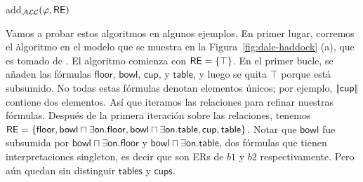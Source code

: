 \begin{algorithm}[H]
\caption{add$_\mathcal{ALC}(\varphi,\textsf{RE})$}
\label{algo:bisim-add-alc}
\end{algorithm}

Vamos a probar estos algoritmos en algunos ejemplos. En primer lugar, corremos el \el \.
algoritmo en el modelo que se muestra en la Figura~\ref{fig:dale-haddock} (a), que es
tomado de \cite{dale91:gener}. El
algoritmo comienza con $ \textsf{RE} = \{\top \} $. En el primer bucle, se a\~naden
las f\'ormulas $\mathsf{floor}$, $\mathsf{bowl}$, $\mathsf{cup}$, y
$\mathsf{table}$, y luego se quita $\top$ porque est\'a subsumido.
No todas estas f\'ormulas denotan elementos \'unicos; por ejemplo,
$|\!|\mathsf{cup}|\!|$ contiene dos elementos. As\'i que iteramos
las relaciones para refinar nuestras f\'ormulas. Despu\'es de la primera iteraci\'on sobre
las relaciones, tenemos  $\textsf{RE} = \{ \mathsf{floor}, \mathsf{bowl} \sqcap
\exists \mathsf{on}.\mathsf{floor}, \mathsf{bowl} \sqcap \exists
\mathsf{on}.\mathsf{table}, \mathsf{cup}, \mathsf{table} \}$. Notar que
$\mathsf{bowl}$ fue subsumida por $\mathsf{bowl} \sqcap
\exists \mathsf{on}.\mathsf{floor}$ y $\mathsf{bowl} \sqcap \exists
\mathsf{on}.\mathsf{table}$, dos f\'ormulas que tienen interpretaciones singleton, es decir que son ERs de $b1$ y $b2$ respectivamente. Pero a\'un quedan sin distinguir $\mathsf{tables}$ y $\mathsf{cups}$.

